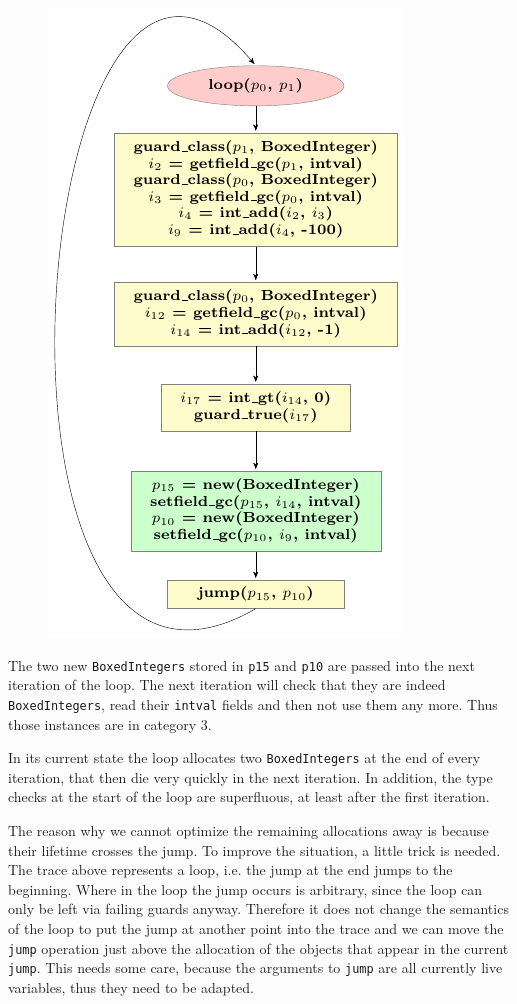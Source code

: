 \documentclass{sigplanconf}
\begin{document}
\begin{figure}
\includegraphics{figures/step1.pdf}
\end{figure}

The two new \texttt{BoxedIntegers} stored in \texttt{p15} and \texttt{p10} are passed into
the next iteration of the loop. The next iteration will check that they are
indeed \texttt{BoxedIntegers}, read their \texttt{intval} fields and then not use them
any more. Thus those instances are in category 3.

In its current state the loop
allocates two \texttt{BoxedIntegers} at the end of every iteration, that then die
very quickly in the next iteration. In addition, the type checks at the start
of the loop are superfluous, at least after the first iteration.

The reason why we cannot optimize the remaining allocations away is because
their lifetime crosses the jump. To improve the situation, a little trick is
needed. The trace above represents a loop, i.e. the jump at the end jumps to
the beginning. Where in the loop the jump occurs is arbitrary, since the loop
can only be left via failing guards anyway. Therefore it does not change the
semantics of the loop to put the jump at another point into the trace and we
can move the \texttt{jump} operation just above the allocation of the objects that
appear in the current \texttt{jump}. This needs some care, because the arguments to
\texttt{jump} are all currently live variables, thus they need to be adapted.
\end{document}
